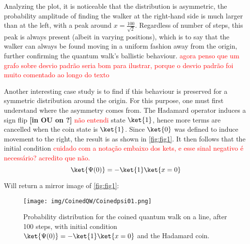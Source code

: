                 Analyzing the plot, it is noticeable that the distribution is asymmetric, the probability amplitude of finding the walker at the right-hand side is much larger than at the left, with a peak around $x=\frac{100}{\sqrt{2}}$. Regardless of number of steps, this peak is always present (albeit in varying positions), which is to say that the walker can always be found moving in a uniform fashion away from the origin, further confirming the quantum walk's ballistic behaviour. \textcolor{red}{agora penso que um grafo sobre desvio padrão seria bom para ilustrar, porque o desvio padrão foi muito comentado ao longo do texto}\par
                Another interesting case study is to find if this behaviour is preserved for a symmetric distribution around the origin. For this purpose, one must first understand where the asymmetry comes from. The Hadamard operator induces a sign flip \textbf{[in OU on ?]} \textcolor{red}{não entendi} state $\ket{1}$, hence more terms are cancelled when the coin state is $\ket{1}$. Since $\ket{0}$ was defined to induce movement to the right, the result is as shown in \ref{fig:fig1}. It then follows that the initial condition \textcolor{red}{cuidado com a notação embaixo dos kets, e esse sinal negativo é necessário? acredito que não.}
                \begin{equation}
                    \ket{\Psi(0)} = -\ket{1}\ket{x=0}
                    \label{eq:12}
                \end{equation}
                
                Will return a mirror image of \ref{fig:fig1}:
    	        \begin{figure}[!h]
                    \centering
                    \texttt{[image: img/CoinedQW/Coinedpsi01.png]}
                    \caption{Probability distribution for the coined quantum walk on a line, after 100 steps, with initial condition $\ket{\Psi(0)}=-\ket{1}\ket{x=0}$ and the Hadamard coin.} 
                    \label{fig:fig2}
                \end{figure}
                
